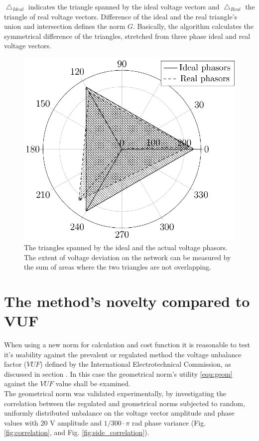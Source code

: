             $\bigtriangleup_{Ideal}$ indicates the triangle spanned by the ideal voltage vectors and $\bigtriangleup_{Real}$ the triangle of real voltage vectors. Difference of the ideal and the real triangle's union and intersection defines the norm $G$. Basically, the algorithm calculates the symmetrical difference of the triangles, stretched from three phase ideal and real voltage vectors.

            \begin{figure}[!ht]
           \centering
           \includegraphics[scale=0.95]{Unblance_EPS_Pics/UnbalRedComp_JCP-figure1.eps}
           \caption{The triangles spanned by the ideal and the actual voltage phasors. The extent of voltage deviation on the network can be measured by the sum of areas where the two triangles are not overlapping.}
           \label{fig:threephase}
            \end{figure}

\section{The method's novelty compared to VUF}\label{VUB:sec:AdditionalContent}

When using a new norm for calculation and cost function it is reasonable to test it's usability against the prevalent or regulated method the voltage unbalance factor ($VUF$) defined by the International Electrotechnical Commission, as discussed in section . In this case the geometrical norm's utility \ref{equ:geom} against the $VUF$ value shall be examined. \\
The geometrical norm was validated experimentally, by investigating the correlation between the regulated  and geometrical norms subjected to random, uniformly distributed unbalance on the voltage vector amplitude and phase values with $20$ V amplitude and $1/300\cdot\pi$ rad phase variance (Fig. \ref{fig:correlation}, and Fig. \ref{fig:side_correlation}).

